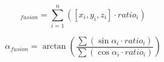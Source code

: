 \documentclass{styles/svproc}
\begin{document}
	\begin{equation}
	[x,y,z]_{fusion} = \sum_{i=1}^{n} ([x_{i},y_{i},z_{i}] \cdot ratio_{i})
	\label{eq:xyzfusion}
	\end{equation}
	
	\begin{equation}
	\alpha_{fusion} = \arctan \left( \frac{ \sum ( \sin \alpha_{i} \cdot ratio_{i} ) }{ \sum ( \cos \alpha_{i} \cdot ratio_{i} ) } \right)
	\label{eq:alphafusion}
	\end{equation}
	
	

	
	
	
	
	
	
\end{document}

